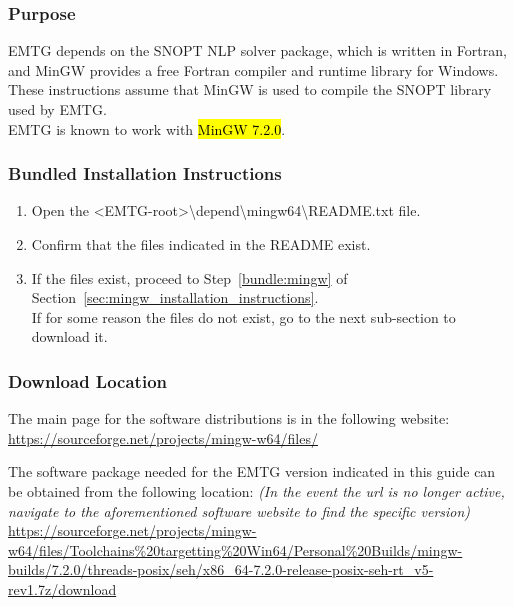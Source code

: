 
\subsubsection{Purpose}
\noindent \ac{EMTG} depends on the \ac{SNOPT} \ac{NLP} solver package, which is written in Fortran, and MinGW provides a free Fortran compiler and runtime library for Windows. These instructions assume that MinGW is used to compile the \ac{SNOPT} library used by \ac{EMTG}. \\ \ac{EMTG} is known to work with \hl{MinGW 7.2.0}.

\subsubsection{Bundled Installation Instructions}
\begin{enumerate}
	\item Open the \textless EMTG-root\textgreater \textbackslash depend\textbackslash mingw64\textbackslash README.txt file.
	\item Confirm that the files indicated in the README exist.
	\item If the files exist, proceed to Step~\ref{bundle:mingw} of Section~\ref{sec:mingw_installation_instructions}. \\ If for some reason the files do not exist, go to the next sub-section to download it.
\end{enumerate}

\subsubsection{Download Location}
\noindent The main page for the software distributions is in the following website: \\
\url{https://sourceforge.net/projects/mingw-w64/files/}

\noindent The software package needed for the EMTG version indicated in this guide can be obtained from the following location:
\emph{(In the event the url is no longer active, navigate to the aforementioned software website to find the specific version)} \\ \url{https://sourceforge.net/projects/mingw-w64/files/Toolchains%20targetting%20Win64/Personal%20Builds/mingw-builds/7.2.0/threads-posix/seh/x86_64-7.2.0-release-posix-seh-rt_v5-rev1.7z/download}

